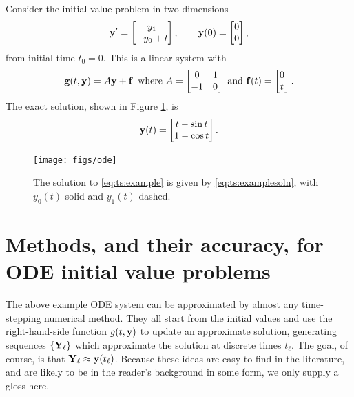 \noindent\hrulefill
\begin{example}  \label{ex:ts:odeeasy} Consider the initial value problem in two dimensions
\begin{equation}
   \mathbf{y}' = \begin{bmatrix} y_1 \\ - y_0 + t\end{bmatrix}, \qquad \mathbf{y}(0) = \begin{bmatrix} 0 \\ 0 \end{bmatrix}, \label{eq:ts:example}
\end{equation}
from initial time $t_0=0$.  This is a linear system with
    $$\mathbf{g}(t,\mathbf{y}) = A \mathbf{y} + \mathbf{f} \,\text{ where } A = \begin{bmatrix} 0 & 1 \\ -1 & 0 \end{bmatrix} \text{ and } \mathbf{f}(t) = \begin{bmatrix} 0 \\ t\end{bmatrix}.$$
The exact solution, shown in Figure \ref{fig:ts:ode}, is
\begin{equation}
    \mathbf{y}(t) = \begin{bmatrix} t - \sin t \\ 1 - \cos t \end{bmatrix}.\label{eq:ts:examplesoln}
\end{equation}

\vspace{-3mm}
\begin{figure}
\texttt{[image: figs/ode]}
\caption{The solution to \eqref{eq:ts:example} is given by \eqref{eq:ts:examplesoln}, with $y_0(t)$ solid and $y_1(t)$ dashed.}
\label{fig:ts:ode}
\end{figure}
\end{example}
\vspace{-5mm}
\noindent\hrulefill


\section{Methods, and their accuracy, for ODE initial value problems}

The above example ODE system can be approximated by almost any time-stepping numerical method.  They all start from the initial values and use the right-hand-side function $g(t,\mathbf{y})$ to update an approximate solution, generating sequences $\{\mathbf{Y}_\ell\}$ which approximate the solution at discrete times $t_\ell$.  The goal, of course, is that $\mathbf{Y}_\ell \approx \mathbf{y}(t_\ell)$.  Because these ideas are easy to find in the literature, and are likely to be in the reader's background in some form, we only supply a gloss here.

